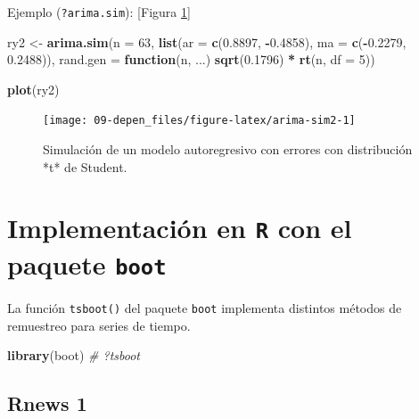 \documentclass[]{book}
\newenvironment{Shaded}{\begin{snugshade}}{\end{snugshade}}
\newcommand{\KeywordTok}[1]{\textcolor[rgb]{0.13,0.29,0.53}{\textbf{#1}}}
\newcommand{\DataTypeTok}[1]{\textcolor[rgb]{0.13,0.29,0.53}{#1}}
\newcommand{\DecValTok}[1]{\textcolor[rgb]{0.00,0.00,0.81}{#1}}
\newcommand{\FloatTok}[1]{\textcolor[rgb]{0.00,0.00,0.81}{#1}}
\newcommand{\StringTok}[1]{\textcolor[rgb]{0.31,0.60,0.02}{#1}}
\newcommand{\CommentTok}[1]{\textcolor[rgb]{0.56,0.35,0.01}{\textit{#1}}}
\newcommand{\ControlFlowTok}[1]{\textcolor[rgb]{0.13,0.29,0.53}{\textbf{#1}}}
\newcommand{\OperatorTok}[1]{\textcolor[rgb]{0.81,0.36,0.00}{\textbf{#1}}}
\newcommand{\NormalTok}[1]{#1}
\theoremstyle{definition}
\theoremstyle{definition}
\theoremstyle{definition}
\theoremstyle{remark}
\begin{document}
Ejemplo (\texttt{?arima.sim}): {[}Figura \ref{fig:arima-sim2}{]}

\begin{Shaded}
\begin{Highlighting}[]
\NormalTok{ry2 <-}\StringTok{ }\KeywordTok{arima.sim}\NormalTok{(}\DataTypeTok{n =} \DecValTok{63}\NormalTok{, }\KeywordTok{list}\NormalTok{(}\DataTypeTok{ar =} \KeywordTok{c}\NormalTok{(}\FloatTok{0.8897}\NormalTok{, }\OperatorTok{-}\FloatTok{0.4858}\NormalTok{), }
          \DataTypeTok{ma =} \KeywordTok{c}\NormalTok{(}\OperatorTok{-}\FloatTok{0.2279}\NormalTok{, }\FloatTok{0.2488}\NormalTok{)),}
          \DataTypeTok{rand.gen =} \ControlFlowTok{function}\NormalTok{(n, ...) }\KeywordTok{sqrt}\NormalTok{(}\FloatTok{0.1796}\NormalTok{) }\OperatorTok{*}\StringTok{ }\KeywordTok{rt}\NormalTok{(n, }\DataTypeTok{df =} \DecValTok{5}\NormalTok{))}

\KeywordTok{plot}\NormalTok{(ry2)}
\end{Highlighting}
\end{Shaded}

\begin{figure}[!htb]

{\centering \texttt{[image: 09-depen\_files/figure-latex/arima-sim2-1]} 

}

\caption{Simulación de un modelo autoregresivo con errores con distribución *t* de Student.}\label{fig:arima-sim2}
\end{figure}

\section{\texorpdfstring{Implementación en \texttt{R} con el paquete
\texttt{boot}}{Implementación en R con el paquete boot}}\label{implementacion-en-r-con-el-paquete-boot}

La función \texttt{tsboot()} del paquete \texttt{boot} implementa
distintos métodos de remuestreo para series de tiempo.

\begin{Shaded}
\begin{Highlighting}[]
\KeywordTok{library}\NormalTok{(boot)}
\CommentTok{# ?tsboot}
\end{Highlighting}
\end{Shaded}

\subsection{Rnews 1}\label{rnews-1}
\end{document}
